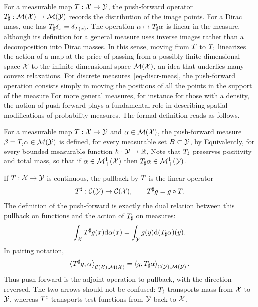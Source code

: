 For a measurable map $T : \mathcal{X} \rightarrow \mathcal{Y}$, the push-forward operator $T_\sharp : \mathcal{M}(\mathcal{X}) \rightarrow \mathcal{M}(\mathcal{Y})$ records the distribution of the image points.
%
For a Dirac mass, one has $T_\sharp \delta_{x} = \delta_{T(x)}$. The operation $\alpha\mapsto T_\sharp\alpha$ is linear in the measure, although its definition for a general measure uses inverse images rather than a decomposition into Dirac masses. In this sense, moving from $T$ to $T_\sharp$ linearizes the action of a map at the price of passing from a possibly finite-dimensional space $\mathcal{X}$ to the infinite-dimensional space $\mathcal{M}(\mathcal{X})$, an idea that underlies many convex relaxations.
%
For discrete measures~\eqref{eq-discr-meas}, the push-forward operation consists simply in moving the positions of all the points in the support of the measure
For more general measures, for instance for those with a density, the notion of push-forward plays a fundamental role in describing spatial modifications of probability measures. The formal definition reads as follows.

\begin{defn}\label{defn-pushfwd}
For a measurable map $T : \mathcal{X} \rightarrow \mathcal{Y}$ and $\alpha \in \mathcal{M}(\mathcal{X})$, the push-forward measure $\beta = T_\sharp \alpha \in \mathcal{M}(\mathcal{Y})$ is defined, for every measurable set $B\subset\mathcal{Y}$, by
Equivalently, for every bounded measurable function $h:\mathcal{Y}\to\mathbb{R}$,
Note that $T_\sharp$ preserves positivity and total mass, so that if $\alpha \in \mathcal{M}_+^1(\mathcal{X})$ then $T_\sharp \alpha \in \mathcal{M}_+^1(\mathcal{Y})$.
\end{defn}


\begin{rem}\label{rem-pullback-pushforward}\label{rem-push-forward-pull-back}
	If $T:\mathcal{X}\to\mathcal{Y}$ is continuous, the pullback by $T$ is the linear operator
	\[
		T^\sharp:\mathcal{C}(\mathcal{Y})\to\mathcal{C}(\mathcal{X}),
		\qquad
		T^\sharp g=g\circ T.
	\]
	The definition of the push-forward is exactly the dual relation between this pullback on functions and the action of $T_\sharp$ on measures:
	\[
		\int_{\mathcal{X}} T^\sharp g(x)\mathrm{d}\alpha(x)
		=
		\int_{\mathcal{Y}} g(y)\mathrm{d}(T_\sharp\alpha)(y).
	\]
	In pairing notation,
	\[
		\left\langle T^\sharp g,\alpha\right\rangle_{\mathcal{C}(\mathcal{X}),\mathcal{M}(\mathcal{X})}
		=
		\left\langle g,T_\sharp\alpha\right\rangle_{\mathcal{C}(\mathcal{Y}),\mathcal{M}(\mathcal{Y})}.
	\]
	Thus push-forward is the adjoint operation to pullback, with the direction reversed. The two arrows should not be confused: $T_\sharp$ transports mass from $\mathcal{X}$ to $\mathcal{Y}$, whereas $T^\sharp$ transports test functions from $\mathcal{Y}$ back to $\mathcal{X}$.
\end{rem}


